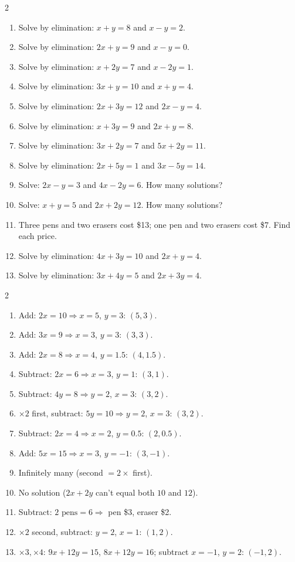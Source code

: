 \documentclass[11pt]{article}
\begin{document}
\begin{recapbox}
\begin{multicols}{2}
\small
\begin{enumerate}[leftmargin=*,itemsep=3pt]
  \item Solve by elimination: $x+y=8$ and $x-y=2$.
  \item Solve by elimination: $2x+y=9$ and $x-y=0$.
  \item Solve by elimination: $x+2y=7$ and $x-2y=1$.
  \item Solve by elimination: $3x+y=10$ and $x+y=4$.
  \item Solve by elimination: $2x+3y=12$ and $2x-y=4$.
  \item Solve by elimination: $x+3y=9$ and $2x+y=8$.
  \item Solve by elimination: $3x+2y=7$ and $5x+2y=11$.
  \item Solve by elimination: $2x+5y=1$ and $3x-5y=14$.
  \item Solve: $2x-y=3$ and $4x-2y=6$. How many solutions?
  \item Solve: $x+y=5$ and $2x+2y=12$. How many solutions?
  \item Three pens and two erasers cost \$13; one pen and two erasers cost \$7. Find each price.
  \item Solve by elimination: $4x+3y=10$ and $2x+y=4$.
  \item Solve by elimination: $3x+4y=5$ and $2x+3y=4$.
\end{enumerate}
\end{multicols}
\end{recapbox}

\begin{keybox}
\begin{multicols}{2}
\small
\begin{enumerate}[leftmargin=*,itemsep=3pt]
  \item Add: $2x=10\Rightarrow x=5$, $y=3$: $(5,3)$.
  \item Add: $3x=9\Rightarrow x=3$, $y=3$: $(3,3)$.
  \item Add: $2x=8\Rightarrow x=4$, $y=1.5$: $(4,1.5)$.
  \item Subtract: $2x=6\Rightarrow x=3$, $y=1$: $(3,1)$.
  \item Subtract: $4y=8\Rightarrow y=2$, $x=3$: $(3,2)$.
  \item $\times2$ first, subtract: $5y=10\Rightarrow y=2$, $x=3$: $(3,2)$.
  \item Subtract: $2x=4\Rightarrow x=2$, $y=0.5$: $(2,0.5)$.
  \item Add: $5x=15\Rightarrow x=3$, $y=-1$: $(3,-1)$.
  \item Infinitely many (second $=2\times$ first).
  \item No solution ($2x+2y$ can't equal both $10$ and $12$).
  \item Subtract: $2\text{ pens}=6\Rightarrow$ pen \$3, eraser \$2.
  \item $\times2$ second, subtract: $y=2$, $x=1$: $(1,2)$.
  \item $\times3,\times4$: $9x+12y=15$, $8x+12y=16$; subtract $x=-1$, $y=2$: $(-1,2)$.
\end{enumerate}
\end{multicols}
\end{keybox}
\end{document}
